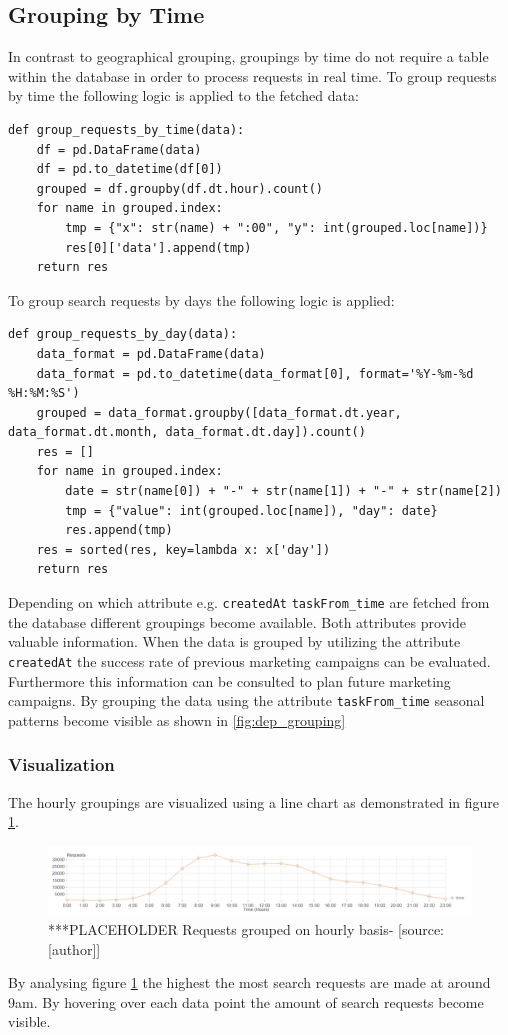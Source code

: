 \subsection{Grouping by Time}
In contrast to geographical grouping, groupings by time do not require a table within the database in order to process requests in real time. To group requests by time the following logic is applied to the fetched data: 
\begin{lstlisting}
def group_requests_by_time(data):
    df = pd.DataFrame(data)
    df = pd.to_datetime(df[0])
    grouped = df.groupby(df.dt.hour).count()
    for name in grouped.index:
        tmp = {"x": str(name) + ":00", "y": int(grouped.loc[name])}
        res[0]['data'].append(tmp)
    return res
\end{lstlisting}
To group search requests by days the following logic is applied: 
\begin{lstlisting}
def group_requests_by_day(data):
    data_format = pd.DataFrame(data)
    data_format = pd.to_datetime(data_format[0], format='%Y-%m-%d %H:%M:%S')
    grouped = data_format.groupby([data_format.dt.year, data_format.dt.month, data_format.dt.day]).count()
    res = []
    for name in grouped.index:
        date = str(name[0]) + "-" + str(name[1]) + "-" + str(name[2])
        tmp = {"value": int(grouped.loc[name]), "day": date}
        res.append(tmp)
    res = sorted(res, key=lambda x: x['day'])
    return res
\end{lstlisting}
Depending on which attribute e.g. \verb|createdAt| \verb|taskFrom_time| are fetched from the database different groupings become available. Both attributes provide valuable information. When the data is grouped by utilizing the attribute \verb|createdAt| the success rate of previous marketing campaigns can be evaluated. Furthermore this information can be consulted to plan future marketing campaigns. By grouping the data using the attribute \verb|taskFrom_time| seasonal patterns become visible as shown in \ref{fig:dep_grouping}
\subsubsection{Visualization}
The hourly groupings are visualized using a line chart as demonstrated in figure \ref{fig:hourly_grouping}.
\begin{figure}[H]
	\centering
		\includegraphics[width=15cm]{images/requests_hour}
	\caption{***PLACEHOLDER Requests grouped on hourly basis- [source:[author]]}
	\label{fig:hourly_grouping}
\end{figure}
By analysing figure \ref{fig:hourly_grouping} the highest the most search requests are made at around 9am. By hovering over each data point the amount of search requests become visible. 
\newline
 
